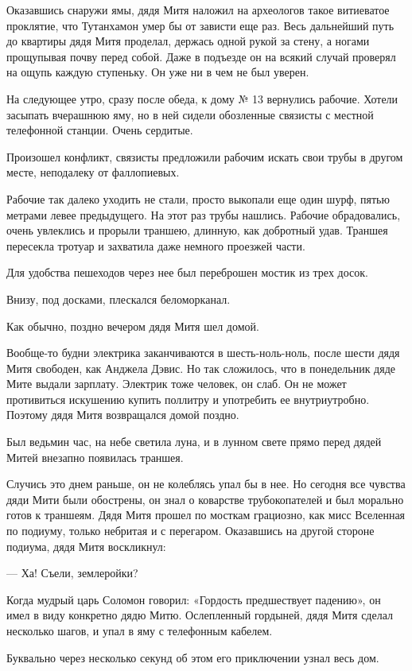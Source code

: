 Оказавшись снаружи ямы, дядя Митя наложил на археологов такое витиеватое
проклятие, что Тутанхамон умер бы от зависти еще раз. Весь дальнейший путь до
квартиры дядя Митя проделал, держась одной рукой за стену, а ногами прощупывая
почву перед собой. Даже в подъезде он на всякий случай проверял на ощупь каждую
ступеньку. Он уже ни в чем не был уверен.

На следующее утро, сразу после обеда, к дому № 13  вернулись рабочие. Хотели
засыпать вчерашнюю яму, но в ней сидели обозленные связисты с местной
телефонной станции. Очень сердитые.

Произошел конфликт, связисты предложили рабочим искать свои трубы в другом
месте, неподалеку от фаллопиевых.

Рабочие так далеко уходить не стали, просто выкопали еще один шурф, пятью
метрами левее предыдущего. На этот раз трубы нашлись. Рабочие обрадовались,
очень увлеклись и прорыли траншею, длинную, как добротный удав. Траншея
пересекла тротуар и захватила даже немного проезжей части.

Для удобства пешеходов через нее был переброшен мостик из трех досок.

Внизу, под досками, плескался беломорканал.

Как обычно, поздно вечером дядя Митя шел домой.

Вообще-то будни электрика заканчиваются в шесть-ноль-ноль, после шести дядя
Митя свободен, как Анджела Дэвис. Но так сложилось, что в понедельник дяде Мите
выдали зарплату. Электрик тоже человек, он слаб. Он не может противиться
искушению купить поллитру и употребить ее внутриутробно. Поэтому дядя Митя
возвращался домой поздно.

Был ведьмин час, на небе светила луна, и в лунном свете прямо перед дядей Митей
внезапно появилась траншея.

Случись это днем раньше, он не колеблясь упал бы в нее. Но сегодня все чувства
дяди Мити были обострены, он знал о коварстве трубокопателей и был морально
готов к траншеям. Дядя Митя прошел по мосткам грациозно, как мисс Вселенная по
подиуму, только небритая и с перегаром. Оказавшись на другой стороне подиума,
дядя Митя воскликнул:

— Ха! Съели, землеройки?

Когда мудрый царь Соломон говорил: «Гордость предшествует падению», он имел в
виду конкретно дядю Митю. Ослепленный гордыней, дядя Митя сделал несколько
шагов, и упал в яму с телефонным кабелем.

Буквально через несколько секунд об этом его приключении узнал весь дом.

